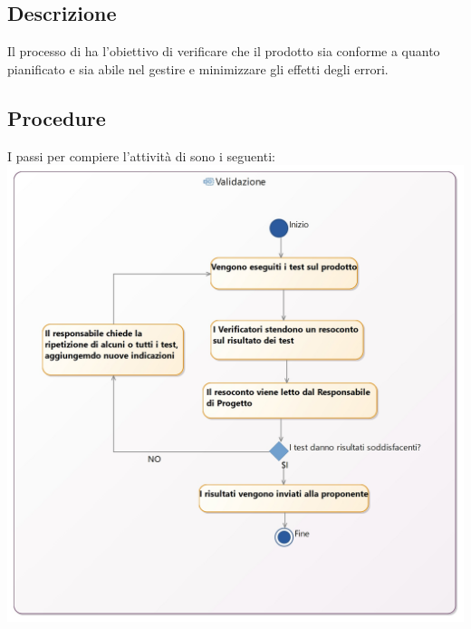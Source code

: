 \documentclass[NormeDiProgetto.tex]{subfiles}
\begin{document}
	\subsection{Descrizione}
		Il processo di  ha l'obiettivo di verificare che il prodotto sia conforme a quanto pianificato e sia abile nel gestire e minimizzare gli effetti degli errori.
	\subsection{Procedure}
		I passi per compiere l’attività di  sono i seguenti:\\
		\includegraphics[scale=0.2]{../../common/images/Validation}

	 
	
	
\end{document}
